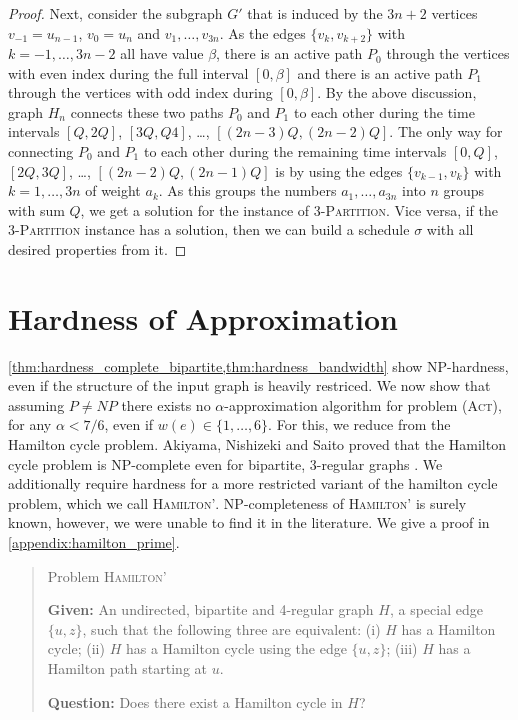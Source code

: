 \documentclass[runningheads]{llncs}
\numberwithin{equation}{section}
\newcommand{\set}[1]{\{ #1 \}}
\newcommand{\act}{\textsc{(Act)}}
\begin{document}
\begin{proof}
Next, consider the subgraph $G'$ that is induced by the $3n+2$ vertices $v_{-1}=u_{n-1}$, $v_0=u_n$ and 
$v_1,\ldots,v_{3n}$.
As the edges $\{v_k, v_{k+2}\}$ with $k=-1,\ldots,3n-2$ all have value $\beta$, there is an active path $P_0$ 
through the vertices with even index during the full interval $[0,\beta]$ and there is an active 
path $P_1$ through the vertices with odd index during $[0, \beta]$.
By the above discussion, graph $H_n$ connects these two paths $P_0$ and $P_1$ to each other during the
time intervals $[Q,2Q]$, $[3Q,Q4]$, \dots, $[(2n-3)Q,(2n-2)Q]$.
The only way for connecting $P_0$ and $P_1$ to each other during the remaining time intervals 
$[0,Q]$, $[2Q,3Q]$, \dots, $[(2n-2)Q,(2n-1)Q]$ is by using the edges $\{v_{k-1},v_k\}$ with $k=1,\ldots,3n$ of 
weight $a_k$.
As this groups the numbers $a_1,\ldots,a_{3n}$ into $n$ groups with sum $Q$, we get a solution
for the instance of \textsc{3-Partition}.
Vice versa, if the \textsc{3-Partition} instance has a solution, then we can build a schedule $\sigma$
with all desired properties from it.
\end{proof}

\section{Hardness of Approximation}
\label{sec:inapprox}

\cref{thm:hardness_complete_bipartite,thm:hardness_bandwidth} show NP-hardness, even if the structure of the input graph is heavily restriced. 
We now show that assuming $P \neq NP$ there exists no $\alpha$-approximation algorithm for problem {\act}, for 
any $\alpha < 7/6$, even if $w(e) \in \{1,\dots,6\}$.
For this, we reduce from the Hamilton cycle problem. Akiyama, Nishizeki and Saito proved that the Hamilton cycle problem is NP-complete even for bipartite, 3-regular graphs \cite{hamilton3regularBip}. We additionally require hardness for a more restricted variant of the hamilton cycle problem, which we call \textsc{Hamilton'}. NP-completeness of \textsc{Hamilton'} is surely known, however, we were unable to find it in the literature. We give a proof in \cref{appendix:hamilton_prime}.

\begin{quote}

Problem \textsc{Hamilton'} 

\textbf{Given:} An undirected, bipartite and 4-regular graph $H$, a special edge $\set{u, z}$, such that the following three are equivalent: (i) $H$ has a Hamilton cycle; (ii) $H$ has a Hamilton cycle using the edge $\set{u, z}$; (iii) $H$ has a Hamilton path starting at $u$.

\textbf{Question:} Does there exist a Hamilton cycle in $H$?

\end{quote}
\end{document}

